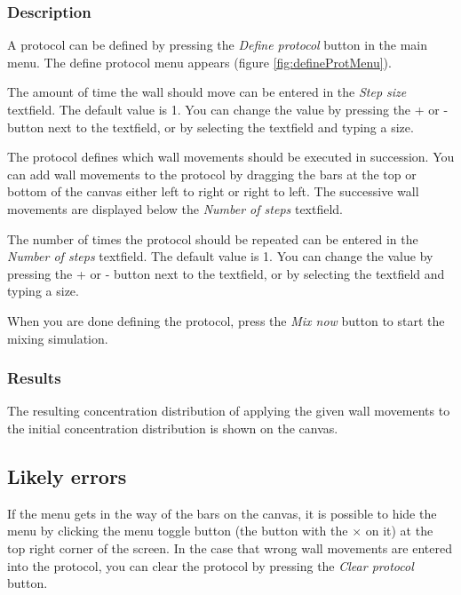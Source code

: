\subsubsection{Description}
A protocol can be defined by pressing the \emph{Define protocol} button in the main menu. The define protocol menu appears (figure \ref{fig:defineProtMenu}).


The amount of time the wall should move can be entered in the \emph{Step size} textfield. The default value is 1. You can change the value by pressing the + or - button next to the textfield, or by selecting the textfield and typing a size.

The protocol defines which wall movements should be executed in succession. You can add wall movements to the protocol by dragging the bars at the top or bottom of the canvas either left to right or right to left. The successive wall movements are displayed below the \emph{Number of steps} textfield.

The number of times the protocol should be repeated can be entered in the \emph{Number of steps} textfield. The default value is 1. You can change the value by pressing the + or - button next to the textfield, or by selecting the textfield and typing a size.

When you are done defining the protocol, press the \emph{Mix now} button to start the mixing simulation.

\subsubsection{Results}
The resulting concentration distribution of applying the given wall movements to the initial concentration distribution is shown on the canvas.

\subsection{Likely errors}
If the menu gets in the way of the bars on the canvas, it is possible to hide the menu by clicking the menu toggle button (the button with the $\times$ on it) at the top right corner of the screen. In the case that wrong wall movements are entered into the protocol, you can clear the protocol by pressing the \emph{Clear protocol} button.


